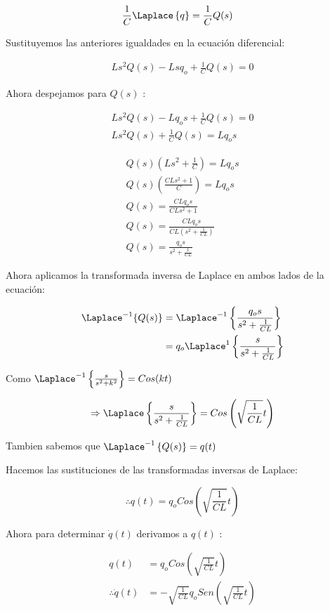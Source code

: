 \begin{align*}
    \frac{1}{C} \Laplace \left\{ q \right\} &= \frac{1}{C} Q(s)
\end{align*}

Sustituyemos las anteriores igualdades en la ecuación diferencial:

\begin{align*}
    L s^{2}Q(s) -Lsq_{o} + \frac{1}{C} Q(s) = 0 
\end{align*}

Ahora despejamos para $Q(s)$ :

\begin{align*}
    L s^{2}Q(s) -Lq_{o}s + \frac{1}{C} Q(s) = 0 \\
    L s^{2}Q(s) + \frac{1}{C} Q(s) = Lq_{o}s 
\end{align*}

\begin{align*}
    Q(s) \left( L s^{2} + \frac{1}{C} \right) = Lq_{o}s \\
    Q(s) \left( \frac{CL s^{2}+1}{C} \right) = Lq_{o}s \\
    Q(s)  = \frac{CLq_{o}s}{CL s^{2}+1} \\
    Q(s)  = \frac{CLq_{o}s}{ CL \left( s^{2} + \frac{1}{CL} \right) } \\
    Q(s)  = \frac{q_{o}s}{  s^{2} + \frac{1}{CL}  }
\end{align*}

Ahora aplicamos la transformada inversa de Laplace en ambos lados de la ecuación:


\begin{align*}
    \Laplace^{-1} \{ Q(s) \} &= \Laplace^{-1} \left\{\frac{q_{o}s}{  s^{2} + \frac{1}{CL}  }\right\} \\
                            &= q_{o} \Laplace^{1} \left\{\frac{s}{ s^{2} + \frac{1}{CL} }\right\} 
\end{align*}

Como  $ \Laplace^{-1} \left\{\frac{s}{s^{2}+k^{2}}\right\} = Cos(kt) $

\begin{equation*}
    \Rightarrow \Laplace \left\{ \frac{s}{ s^{2} + \frac{1}{CL}  } \right\} = Cos \left( \sqrt{ \frac{1}{CL} } t \right)
\end{equation*}

Tambien sabemos que $ \Laplace^{-1} \left\{Q(s)\right\} = q(t) $


Hacemos las sustituciones de las transformadas inversas de Laplace:

\begin{equation*}
    \therefore q(t) = q_{o} Cos \left( \sqrt{ \frac{1}{CL} } t \right)
\end{equation*}

Ahora para determinar $\dot{q} (t)$ derivamos a $q(t)$ :

\begin{align*}
    q(t) &= q_{o} Cos \left( \sqrt{ \frac{1}{CL} } t \right) \\
    \therefore \dot{q}(t) &= - \sqrt{ \frac{1}{CL} } q_{o} Sen \left(  \sqrt{ \frac{1}{CL} } t \right)
\end{align*}
